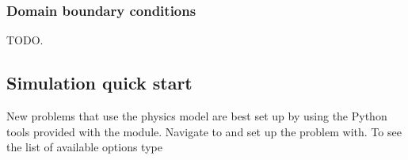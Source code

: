 \documentclass[letterpaper,10pt,english]{sphinxmanual}
\begin{document}
\begin{sphinxVerbatim}[commandchars=\\\{\},formatcom=\scriptsize]
  \PYG{p}{[}
      
       \PYG{p}{[}    \PYG{p}{]}
       
       
  \PYG{p}{]}
  \PYG{p}{[}
      
       \PYG{p}{[}    \PYG{p}{]}
       
       
  \PYG{p}{]}
\end{sphinxVerbatim}


\subsubsection{Domain boundary conditions}
\label{\detokenize{Applications/CdrPlasmaModel:domain-boundary-conditions}}
TODO.


\subsection{Simulation quick start}
\label{\detokenize{Applications/CdrPlasmaModel:simulation-quick-start}}\label{\detokenize{Applications/CdrPlasmaModel:chap-cdrplasmanewproblem}}
New problems that use the  physics model are best set up by using the Python tools provided with the module.
Navigate to  and set up the problem with.
To see the list of available options type
\end{document}
